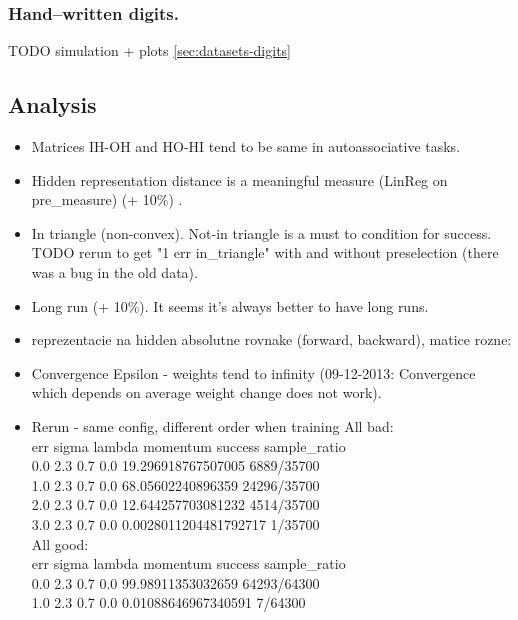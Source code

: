 \subsubsection{Hand--written digits.}
TODO simulation + plots \ref{sec:datasets-digits} 

\subsection{Analysis} 
\begin{itemize} 
\item Matrices IH-OH and HO-HI tend to be same in autoassociative tasks. 
\item Hidden representation distance is a meaningful measure (LinReg on pre\_measure) (+ 10\%) . 
\item In triangle (non-convex). Not-in triangle is a must to condition for success. \\
TODO rerun to get "1 err in\_triangle" with and without preselection (there was a bug in the old data). 

\item Long run (+ 10\%). It seems it's always better to have long runs.  
\item reprezentacie na hidden absolutne rovnake (forward, backward), matice rozne:
\item Convergence Epsilon - weights tend to infinity (09-12-2013: Convergence which depends on average weight change does not work). 
\item Rerun - same config, different order when training 
All bad: \\
err sigma lambda momentum success sample\_ratio \\
0.0 2.3 0.7 0.0 19.296918767507005 6889/35700 \\
1.0 2.3 0.7 0.0 68.05602240896359 24296/35700 \\
2.0 2.3 0.7 0.0 12.644257703081232 4514/35700 \\
3.0 2.3 0.7 0.0 0.0028011204481792717 1/35700 \\

All good:  \\
err sigma lambda momentum success sample\_ratio \\
0.0 2.3 0.7 0.0 99.98911353032659 64293/64300 \\
1.0 2.3 0.7 0.0 0.01088646967340591 7/64300 \\


\end{itemize}

